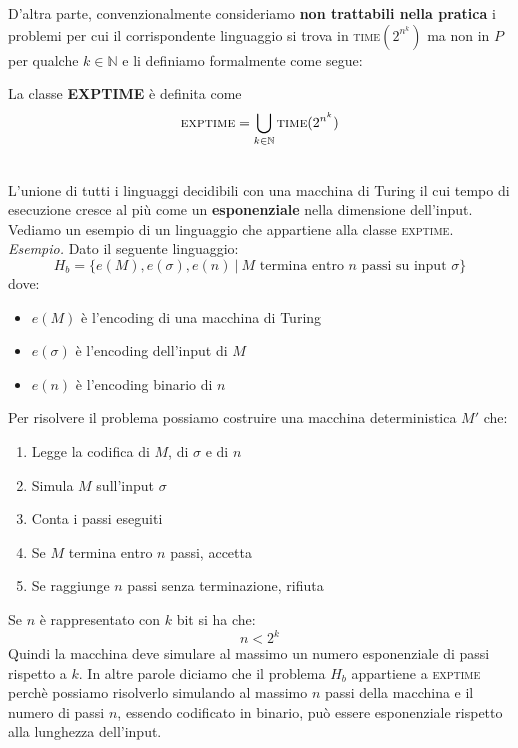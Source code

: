 \newpage
\noindent D'altra parte, convenzionalmente consideriamo \textbf{non trattabili nella pratica} i problemi per cui il corrispondente linguaggio si trova in \textsc{time}$(2^{n^k})$ ma non in $P$ per qualche $k \in \mathbb{N}$ e li definiamo 
formalmente come segue:\smallskip\\
\colorbox{SALZO}{\parbox{\dimexpr\linewidth-2\fboxsep}{\begin{definition}
   La classe \textbf{EXPTIME} è definita come
   \[   \textsc{exptime} =  \bigcup_{k \in \mathbb{N}} \textsc{time}(2^{n^k})   \]
\end{definition}}}\smallskip\\
L'unione di tutti i linguaggi decidibili con una macchina di Turing il cui tempo di esecuzione cresce al più come un \textbf{esponenziale} nella dimensione dell'input. \\
Vediamo un esempio di un linguaggio che appartiene alla classe \textsc{exptime}.\smallskip\\
\textit{Esempio.} Dato il seguente linguaggio:
\[         H_b = \big\{    e(M), e (\sigma), e(n) \ | \ M \text{ termina entro } n \text{ passi su input } \sigma  \big\}    \]
dove:
\begin{itemize}[label = --]
    \item $e(M)$ è l'encoding di una macchina di Turing
    \item $e(\sigma)$ è l'encoding dell'input di $M$ 
    \item $e(n)$ è l'encoding binario di $n$
\end{itemize}
Per risolvere il problema possiamo costruire una macchina deterministica $M'$ che:
\begin{enumerate}
    \item Legge la codifica di $M$, di $\sigma$ e di $n$
    \item Simula $M$ sull'input $\sigma$
    \item Conta i passi eseguiti
    \item Se $M$ termina entro $n$ passi, accetta
    \item Se raggiunge $n$ passi senza terminazione, rifiuta 
\end{enumerate}
Se $n$ è rappresentato con $k$ bit si ha che:
\[    n < 2^k  \]
Quindi la macchina deve simulare al massimo un numero esponenziale di passi rispetto a $k$. In altre parole diciamo che il problema $H_b$ appartiene a \textsc{exptime} perchè possiamo risolverlo simulando al massimo $n$ passi della 
macchina e il numero di passi $n$, essendo codificato in binario, può essere esponenziale rispetto alla lunghezza dell'input.




